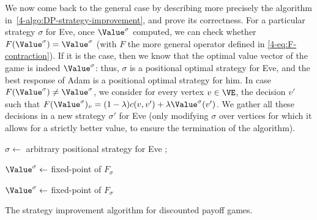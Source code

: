 \medskip

We now come back to the general case by describing more precisely the
algorithm in~\cref{4-algo:DP-strategy-improvement}, and prove its
correctness.  For a particular strategy $\sigma$ for Eve, once
$\Value^\sigma$ computed, we can check whether
$F(\Value^\sigma)=\Value^\sigma$ (with $F$ the more general operator
defined in \eqref{4-eq:F-contraction}). If it is the case, then we
know that the optimal value vector of the game is indeed
$\Value^\sigma$: thus, $\sigma$ is a positional optimal strategy for
Eve, and the best response of Adam is a positional optimal strategy
for him. In case $F(\Value^\sigma)\neq\Value^\sigma$, we consider for
every vertex $v\in \VE$, the decision $v'$ such that
$F(\Value^\sigma)_v=(1-\lambda)c(v,v')+\lambda \Value^\sigma(v')$. We
gather all these decisions in a new strategy $\sigma'$ for Eve (only
modifying $\sigma$ over vertices for which it allows for a strictly
better value, to ensure the termination of the algorithm).

\begin{algorithm}

 $\sigma \leftarrow$ arbitrary positional strategy for Eve ;

 $\Value^\sigma \leftarrow $ fixed-point of $F_\sigma$  

 {   
 {
}

  $\Value^\sigma \leftarrow $ fixed-point of $F_\sigma$   

}

\Return{$(\Value^\sigma,\sigma)$}
\caption{The strategy improvement algorithm for discounted payoff games.}
\label{4-algo:DP-strategy-improvement}
\end{algorithm}

